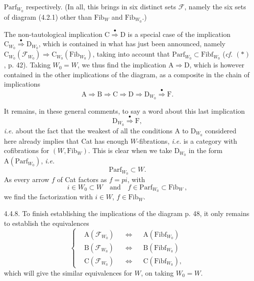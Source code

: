 \documentclass[11pt]{article}
\newcommand{\printedpage}[1]{\marginpar{\footnotesize p.~#1}}
\newcommand{\msp}[1]{\marginpar{\footnotesize [#1]}}
\newcommand{\Fib}{\mathrm{Fib}}
\newcommand{\Fibf}{\mathrm{Fibf}}
\newcommand{\Parf}{\mathrm{Parf}}
\newcommand{\dotimp}{\overset{\bullet}{\Longrightarrow}}
\begin{document}
\setcounter{footnote}{30}

\printedpage{29}
$\Parf_{W_0}$ respectively. (In all, this brings in six distinct sets $\mathcal{F}$, namely the six sets of diagram (4.2.1) other than $\Fib_W$ and $\Fib_{W_0}$.)

The non-tautological implication $\mathrm{C} \dotimp \mathrm{D}$ is a special case of the implication $\mathrm{C}_{W_0} \dotimp \mathrm{D}_{W_0}$, which is contained in what has just been announced, namely $\mathrm{C}_{W_0}(\mathcal{F}_{W_0}) \Longrightarrow \mathrm{C}_{W_0}(\Fib_{W_0})$, taking into account that $\Parf_{W_0} \subset \Fibf_{W_0}$ (\textit{cf.} $(*)$, p. 42). Taking
\msp{page 50}
$W_0 = W$, we thus find the implication $\mathrm{A} \Longrightarrow \mathrm{D}$, which is however contained in the other implications of the diagram, as a composite in the chain of implications
\[
\mathrm{A} \Longrightarrow \mathrm{B} \Longrightarrow \mathrm{C} \Longrightarrow \mathrm{D} \Longrightarrow \mathrm{D}_{W_0} \dotimp \mathrm{F}.
\]

It remains, in these general comments, to say a word about this last implication
\[
\mathrm{D}_{W_0} \dotimp \mathrm{F},
\]
\textit{i.e.} about the fact that the weakest of all the conditions A to $\mathrm{D}_{W_0}$ considered here already implies that Cat has enough $W$-fibrations, \textit{i.e.} is a category with cofibrations for $(W, \Fib_W)$. This is clear when we take $\mathrm{D}_{W_0}$ in the form $\mathrm{A}(\Parf_{W_0})$, \textit{i.e.}
\[
\Parf_{W_0} \subset W.
\]
As every arrow $f$ of Cat factors as $f = pi$, with
\[
i \in W_0 \subset W \quad\text{and}\quad f \in \Parf_{W_0} \subset \Fib_W\, , %
\]
we find the factorization with $i \in W$, $f \in \Fib_W$. %

\msp{page 51}
4.4.8. To finish establishing the implications of the diagram p. 48, it only remains to establish the equivalences
\[
\left\{
\begin{aligned}
&\mathrm{A}(\mathcal{F}_{W_0}) &&\Longleftrightarrow &&\mathrm{A}(\Fibf_{W_0})\\
&\mathrm{B}(\mathcal{F}_{W_0}) &&\Longleftrightarrow &&\mathrm{B}(\Fibf_{W_0})\\
&\mathrm{C}(\mathcal{F}_{W_0}) &&\Longleftrightarrow &&\mathrm{C}(\Fibf_{W_0}),
\end{aligned}
\right.
\tag*{(4.4.8.1)}
\]
which will give the similar equivalences for $W$, on taking $W_0 = W$.
\end{document}
